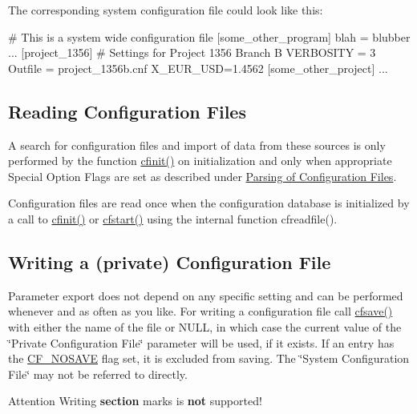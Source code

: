 The corresponding system configuration file could look like this\-: 
\begin{DoxyCode}
 # This is a system wide configuration file
 [some_other_program]
 blah = blubber
 ...
 [project_1356]
 # Settings for Project 1356 Branch B
 VERBOSITY = 3
 Outfile = project_1356b.cnf
 X_EUR_USD=1.4562
 [some_other_project]
 ...
\end{DoxyCode}
\hypertarget{config_files_config_in}{}\subsection{Reading Configuration Files}\label{config_files_config_in}
A search for configuration files and import of data from these sources is only performed by the function \hyperlink{group__cflib__core_ga64fb341565c2ddfccd6669e5e6265a8a}{cfinit()} on initialization and only when appropriate Special Option Flags are set as described under \hyperlink{config_levels_config_file_parsing}{Parsing of Configuration Files}.

Configuration files are read once when the configuration database is initialized by a call to \hyperlink{group__cflib__core_ga64fb341565c2ddfccd6669e5e6265a8a}{cfinit()} or \hyperlink{group__cflib__core_ga6e04a462f9ad273de914af386ff15623}{cfstart()} using the internal function cfreadfile().\hypertarget{config_files_config_out}{}\subsection{Writing a (private) Configuration File}\label{config_files_config_out}
Parameter export does not depend on any specific setting and can be performed whenever and as often as you like. For writing a configuration file call \hyperlink{group__setting__saving_gaad7e1267cd904b4480a0eeaeb03b5f75}{cfsave()} with either the name of the file or {\ttfamily N\-U\-L\-L}, in which case the current value of the \char`\"{}\-Private Configuration File\char`\"{} parameter will be used, if it exists. If an entry has the \hyperlink{group__special__options__mask_gad76153c65f68cc0ee5c1a04c8c3e80bf}{C\-F\-\_\-\-N\-O\-S\-A\-V\-E} flag set, it is excluded from saving. The \char`\"{}\-System Configuration File\char`\"{} may not be referred to directly.

\begin{DoxyAttention}{Attention}
Writing {\bfseries section} marks is {\bfseries not} supported! 
\end{DoxyAttention}
